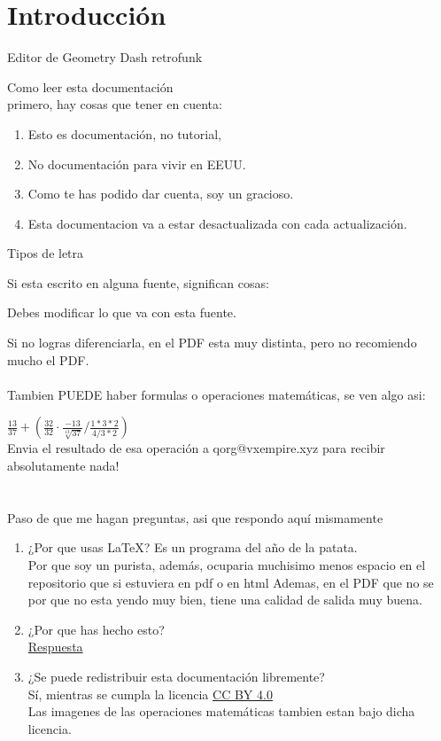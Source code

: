 \chapter{Introducción}
\Huge{Editor de Geometry Dash retrofunk}

\Huge{Como leer esta documentación} \\
\LARGE{primero, hay cosas que tener en cuenta:}
\begin{enumerate}  
\item Esto es documentación, no tutorial,
\item No documentación para vivir en EEUU.
\item Como te has podido dar cuenta, soy un gracioso.
\item Esta documentacion va a estar desactualizada con cada actualización.
\end{enumerate}

\large{Tipos de letra} \\
\normalsize {
Si esta escrito en alguna fuente, significan cosas:

{\ttfamily Debes modificar lo que va con esta fuente.} \\

{ }

Si no logras diferenciarla, en el PDF esta muy distinta, pero no recomiendo mucho el PDF.
\\\\
Tambien PUEDE haber formulas o operaciones matemáticas, se ven algo asi:}
\Huge{
$ \frac{13}{37} + (\frac{32}{32} \cdot \frac{-13}{\sqrt[13]{37}} / \frac{1*3*2}{4/3*2}) $ 
}
\\
\normalsize{Envia el resultado de esa operación a qorg@vxempire.xyz para recibir absolutamente nada!}
\\
\\
\\
\LARGE{Paso de que me hagan preguntas, asi que respondo aquí mismamente}
\begin{enumerate}
\item¿Por que usas LaTeX? Es un programa del año de la patata. \\
  Por que soy un purista, además, ocuparia muchisimo menos espacio en el repositorio que si estuviera en pdf o en html
  Ademas, en el PDF que no se por que no esta yendo muy bien, tiene una calidad de salida muy buena.
\item¿Por que has hecho esto?
  \\
\href{https://youtu.be/JkhX5W7JoWI?t=1m7s}{Respuesta} \\
\item¿Se puede redistribuir esta documentación libremente? \\
  Sí, mientras se cumpla la licencia \href{https://creativecommons.org/licenses/by/4.0/}{CC BY 4.0}
\\ Las imagenes de las operaciones matemáticas tambien estan bajo dicha licencia.
\end{enumerate}

